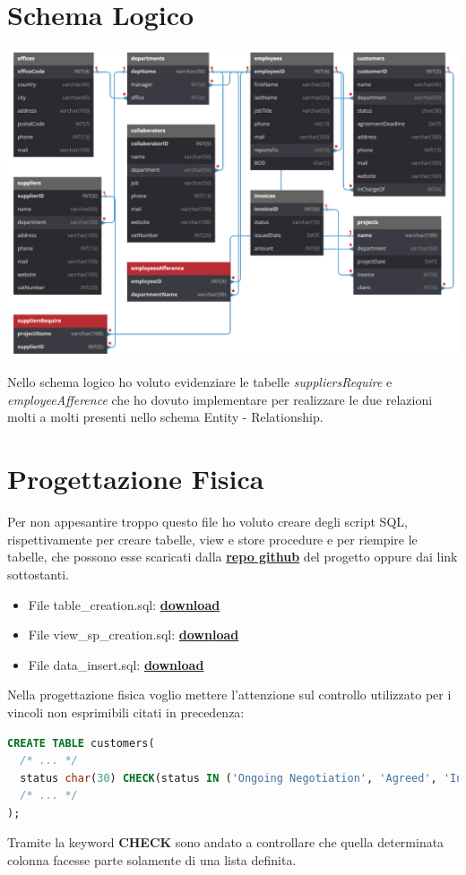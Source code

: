 \documentclass[12pt,a4paper]{article}
\begin{document}
\section{Schema Logico}\label{sec:schema-logico}
\begin{center}
\includegraphics[width=0.9\columnwidth]{../../img/logic_scheme}
\end{center}
Nello schema logico ho voluto evidenziare le tabelle \textit{suppliersRequire} e \textit{employeeAfference} che ho dovuto implementare per realizzare le due relazioni molti a molti presenti nello schema Entity - Relationship.


\clearpage
\section{Progettazione Fisica}\label{sec:progettazione-fisica}
Per non appesantire troppo questo file ho voluto creare degli script SQL, rispettivamente per creare tabelle, view e store procedure e per riempire le tabelle, che possono esse scaricati dalla \href{https://github.com/enricolacchin/database-2023-final-project/}{\textbf{repo github}} del progetto oppure dai link sottostanti.
\begin{itemize}
\item File table\_creation.sql: \href{https://github.com/enricolacchin/database-2023-final-project/SQL/table_creation.sql}{\textbf{download}}
\item File view\_sp\_creation.sql: \href{https://github.com/enricolacchin/database-2023-final-project/SQL/view_sp_creation.sql}{\textbf{download}}
\item File data\_insert.sql: \href{https://github.com/enricolacchin/database-2023-final-project/SQL/data_insert.sql}{\textbf{download}}
\end{itemize}
Nella progettazione fisica voglio mettere l'attenzione sul controllo utilizzato per i vincoli non esprimibili citati in precedenza:
\flushleft
\begin{lstlisting}[language = SQL,label={lst:check}]
CREATE TABLE customers(
  /* ... */
  status char(30) CHECK(status IN ('Ongoing Negotiation', 'Agreed', 'In Progress', 'Done')),
  /* ... */
);
\end{lstlisting}
Tramite la keyword \textbf{CHECK} sono andato a controllare che quella determinata colonna facesse parte solamente di una lista definita.
\end{document}
